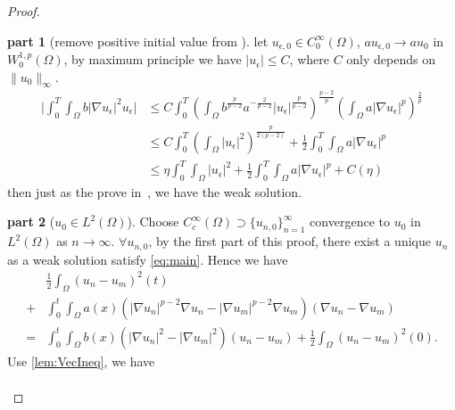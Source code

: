 \documentclass[11pt]{amsart}
\theoremstyle{definition}
\newtheorem{proofpart}{part}
\numberwithin{equation}{section}
\newcommand*\abs[1]{\lvert#1\rvert}
\newcommand*\norm[1]{\lVert#1\rVert}
\newcommand*\Brace[1]{\lbrace#1\rbrace}
\begin{document}
\begin{proof}
\begin{proofpart}[remove positive initial value from {\cite[thm 1.3]{Zhan2019Uniquenessa}}]
	let $u_{\epsilon,0} \in C_0^\infty(\Omega) $, $au_{\epsilon,0} \to au_0 $ in
	$W_0^{1,p}(\Omega) $, by maximum principle we have $\abs{u_{\epsilon}} \leq C$,
	where $C$ only depends on $\norm{u_0}_{\infty} $.
	\begin{equation}
		\begin{split}
			\abs{\int_0^T\int_{\Omega} b\abs{\nabla u_{\epsilon}}^2u_{\epsilon}}
			&\leq C\int_0^T\left( \int_{\Omega} b^{\frac{p}{p-2}}a^{-\frac{2}{p-2}}\abs{u_{\epsilon}}^{\frac{p}{p-2}} \right)^{\frac{p-2}{p}}
			\left(  \int_{\Omega} a\abs{\nabla u_{\epsilon}}^p \right)^{\frac{2}{p}}\\
			&\leq C\int_0^T\left(\int_{\Omega}\abs{u_{\epsilon}}^2\right)^{\frac{p}{2(p-2)}} + \frac{1}{2}\int_0^T\int_{\Omega} a\abs{\nabla u_{\epsilon}}^p\\
			&\leq \eta\int_0^T\int_{\Omega}\abs{u_{\epsilon}}^2 + \frac{1}{2}\int_0^T\int_{\Omega} a\abs{\nabla u_{\epsilon}}^p + C(\eta)
		\end{split}
	\end{equation}
	then just as the prove in~\cite[thm 1.3]{Zhan2019Uniquenessa}, we have the weak solution.
\end{proofpart}
\begin{proofpart}[$u_0 \in L^2(\Omega)$]
	Choose $C_c^{\infty}(\Omega) \supset \Brace{u_{n, 0}}_{n=1}^{\infty} $
	convergence to $u_0$ in $L^2(\Omega) $ as $n \to \infty $. $\forall u_{n, 0}$,
	by the first part of this proof, there exist a unique $u_n$ as a weak solution satisfy \cref{eq:main}.
	Hence we have
	\begin{equation}
		\begin{split}
			& \frac{1}{2}\int_{\Omega}\left(u_n-u_m\right)^2(t)\\
			+{} & \int_{0}^{t}\int_{\Omega}a(x)
			\left(\abs{\nabla u_n}^{p-2}\nabla u_n
			- \abs{\nabla u_m}^{p-2}\nabla u_m\right)
			\left(\nabla u_n - \nabla u_m\right)\\
			={} & \int_{0}^{t}\int_{\Omega}b(x)\left(\abs{\nabla u_n}^2
			- \abs{\nabla u_m}^2\right)\left(u_n - u_m\right)
			+ \frac{1}{2}\int_{\Omega}\left(u_n-u_m\right)^2(0).
		\end{split}
	\end{equation}
	Use \cref{lem:VecIneq}, we have
	\begin{equation}
		\begin{split}

\end{split}
\end{equation}
\end{proofpart}
\end{proof}
\end{document}
